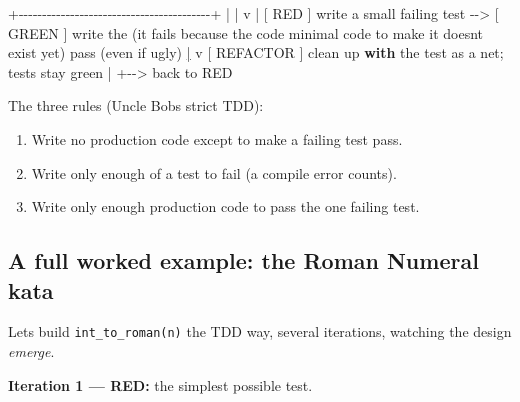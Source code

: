 \documentclass[11pt]{article}
\providecommand{\tightlist}{\setlength{\itemsep}{1pt}\setlength{\parskip}{0pt}}
\newenvironment{Shaded}{\begin{snugshade}}{\end{snugshade}}
\newcommand{\ControlFlowTok}[1]{\textcolor[rgb]{0.99,0.74,0.29}{\textbf{#1}}}
\newcommand{\ErrorTok}[1]{\textcolor[rgb]{0.85,0.27,0.33}{\underline{#1}}}
\newcommand{\ImportTok}[1]{\textcolor[rgb]{0.15,0.68,0.38}{#1}}
\newcommand{\NormalTok}[1]{\textcolor[rgb]{0.81,0.81,0.76}{#1}}
\newcommand{\OperatorTok}[1]{\textcolor[rgb]{0.81,0.81,0.76}{#1}}
\newcommand{\StringTok}[1]{\textcolor[rgb]{0.96,0.31,0.31}{#1}}
\begin{document}
\begin{Shaded}
\begin{Highlighting}[]
        \OperatorTok{+{-}{-}{-}{-}{-}{-}{-}{-}{-}{-}{-}{-}{-}{-}{-}{-}{-}{-}{-}{-}{-}{-}{-}{-}{-}{-}{-}{-}{-}{-}{-}{-}{-}{-}{-}{-}{-}{-}{-}{-}{-}+}
        \OperatorTok{|}                                         \OperatorTok{|}
\NormalTok{        v                                         }\OperatorTok{|}
\NormalTok{   [ RED ] write a small failing test  }\OperatorTok{{-}{-}\textgreater{}}\NormalTok{  [ GREEN ] write the}
\NormalTok{   (it fails because the code            minimal code to make it}
\NormalTok{    doesn}\StringTok{\textquotesingle{}t exist yet)                   pass (even if ugly)}
\ErrorTok{                                              |}
\NormalTok{                                              v}
\NormalTok{                                        [ REFACTOR ] clean up}
                                        \ControlFlowTok{with}\NormalTok{ the test }\ImportTok{as}\NormalTok{ a net}\OperatorTok{;}
\NormalTok{                                        tests stay green}
                                              \OperatorTok{|}
                                              \OperatorTok{+{-}{-}\textgreater{}}\NormalTok{ back to RED}
\end{Highlighting}
\end{Shaded}

The three rules (Uncle Bob\textquotesingle s strict TDD):

\begin{enumerate}
\def\labelenumi{\arabic{enumi}.}
\tightlist
\item
  Write no production code except to make a failing test pass.
\item
  Write only enough of a test to fail (a compile error counts).
\item
  Write only enough production code to pass the one failing test.
\end{enumerate}

\subsection{A full worked example: the Roman Numeral kata}\label{a-full-worked-example-the-roman-numeral-kata}

Let\textquotesingle s build \texttt{int\_to\_roman(n)} the TDD way, several iterations, watching the design \emph{emerge}.

\textbf{Iteration 1 --- RED:} the simplest possible test.
\end{document}
